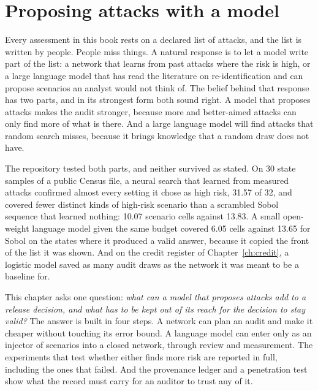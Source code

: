 \chapter{Proposing attacks with a model}\label{ch:proposals}

Every assessment in this book rests on a declared list of attacks, and the list is
written by people. People miss things. A natural response is to let a model write
part of the list: a network that learns from past attacks where the risk is high, or
a large language model that has read the literature on re-identification and can
propose scenarios an analyst would not think of. The belief behind that response has
two parts, and in its strongest form both sound right. A model that proposes attacks
makes the audit stronger, because more and better-aimed attacks can only find more
of what is there. And a large language model will find attacks that random search
misses, because it brings knowledge that a random draw does not have.

The repository tested both parts, and neither survived as stated. On 30 state
samples of a public Census file, a neural search that learned from measured attacks
confirmed almost every setting it chose as high risk, 31.57 of 32, and covered fewer
distinct kinds of high-risk scenario than a scrambled Sobol sequence that learned
nothing: 10.07 scenario cells against 13.83.
A small open-weight language model given the same budget covered 6.05 cells against
13.65 for Sobol on the states where it produced a valid answer, because it copied the
front of the list it was shown.
And on the credit register of Chapter~\ref{ch:credit}, a logistic model saved as many
audit draws as the network it was meant to be a baseline for.

This chapter asks one question: \emph{what can a model that proposes attacks add to a
release decision, and what has to be kept out of its reach for the decision to stay
valid?} The answer is built in four steps. A network can plan an audit and make it
cheaper without touching its error bound. A language model can enter only as an
injector of scenarios into a closed network, through review and measurement. The
experiments that test whether either finds more risk are reported in full, including
the ones that failed. And the provenance ledger and a penetration test show what the
record must carry for an auditor to trust any of it.

